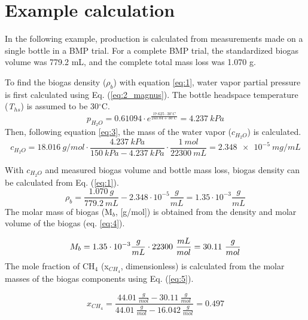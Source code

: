 \section{Example calculation} \label{s_example}
In the following example,  production is calculated from measurements made on a single bottle in a BMP trial.
For a complete BMP trial, the standardized biogas volume was 779.2 mL, and the complete total mass loss was 1.070 g.

To find the biogas density ($\rho_b$) with equation \ref{eq:1}, water vapor partial pressure is first calculated using Eq. (\ref{eq:2_magnus}). 
The bottle headspace temperature (\textit{T}$_{hs}$) is assumed to be 30$^\circ$C.
\begin{equation*}
   p_{H_2O} = 0.61094 \cdot e^{\frac{17.625 \cdot 30^\circ C}{243.04 + 30 ^\circ C}} = 4.237\ kPa
\end{equation*}
Then, following equation \ref{eq:3}, the mass of the water vapor ($c_{H_2O}$) is calculated.
\begin{equation*}
  c_{H_2O} = \SI{18.016} {g/mol} \cdot \frac{\SI{4.237}{kPa}}{\SI{150}{kPa} - \SI{4.237}{kPa}} \cdot \frac{\SI{1}{mol}}{\SI{22300}{mL}} = \SI{2.348e-5}{mg/mL}
\end{equation*}

With $c_{H_2O}$ and measured biogas volume and bottle mass loss, biogas density can be calculated from Eq. (\ref{eq:1}).
\begin{equation*}
  \rho_b=\frac{1.070\ g}{779.2\ mL} - 2.348 \cdot 10^{-5} \frac{g}{mL} = 1.35 \cdot 10^{-3} \frac{g}{mL}
\end{equation*}
The molar mass of biogas (M$_b$, [g/mol]) is obtained from the density and molar volume of the biogas (eq. \ref{eq:4}).

\begin{equation*}
  \centering
  M_b= 1.35 \cdot 10^{-3} \frac{g}{mL} \cdot 22300\ \frac{mL}{mol} = 30.11\ \frac{g}{mol}
\end{equation*}
The mole fraction of CH$_4$ (x$_{CH_4}$, dimensionless) is calculated from the molar masses of the biogas components using Eq. (\ref{eq:5}). 

\begin{equation*}
  x_{CH_4}=\frac{44.01\ \frac{g}{mol}-30.11\ \frac{g}{mol}}{44.01\ \frac{g}{mol}-16.042\ \frac{g}{mol}} = 0.497
\end{equation*}


